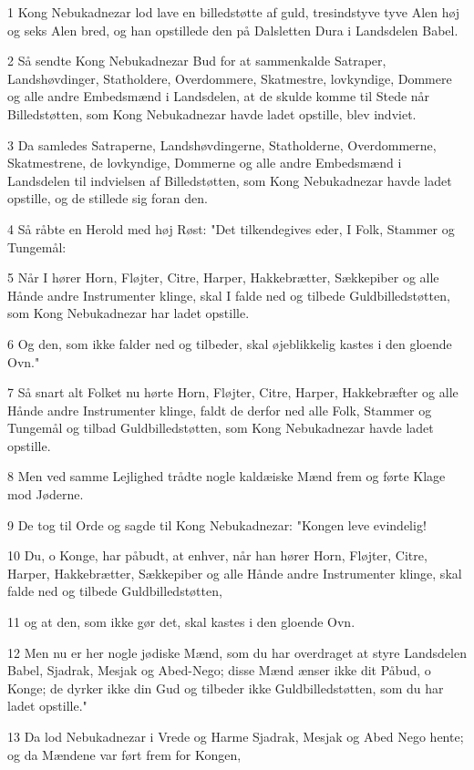 \par 1 Kong Nebukadnezar lod lave en billedstøtte af guld, tresindstyve tyve Alen høj og seks Alen bred, og han opstillede den på Dalsletten Dura i Landsdelen Babel.
\par 2 Så sendte Kong Nebukadnezar Bud for at sammenkalde Satraper, Landshøvdinger, Statholdere, Overdommere, Skatmestre, lovkyndige, Dommere og alle andre Embedsmænd i Landsdelen, at de skulde komme til Stede når Billedstøtten, som Kong Nebukadnezar havde ladet opstille, blev indviet.
\par 3 Da samledes Satraperne, Landshøvdingerne, Statholderne, Overdommerne, Skatmestrene, de lovkyndige, Dommerne og alle andre Embedsmænd i Landsdelen til indvielsen af Billedstøtten, som Kong Nebukadnezar havde ladet opstille, og de stillede sig foran den.
\par 4 Så råbte en Herold med høj Røst: "Det tilkendegives eder, I Folk, Stammer og Tungemål:
\par 5 Når I hører Horn, Fløjter, Citre, Harper, Hakkebrætter, Sækkepiber og alle Hånde andre Instrumenter klinge, skal I falde ned og tilbede Guldbilledstøtten, som Kong Nebukadnezar har ladet opstille.
\par 6 Og den, som ikke falder ned og tilbeder, skal øjeblikkelig kastes i den gloende Ovn."
\par 7 Så snart alt Folket nu hørte Horn, Fløjter, Citre, Harper, Hakkebræfter og alle Hånde andre Instrumenter klinge, faldt de derfor ned alle Folk, Stammer og Tungemål og tilbad Guldbilledstøtten, som Kong Nebukadnezar havde ladet opstille.
\par 8 Men ved samme Lejlighed trådte nogle kaldæiske Mænd frem og førte Klage mod Jøderne.
\par 9 De tog til Orde og sagde til Kong Nebukadnezar: "Kongen leve evindelig!
\par 10 Du, o Konge, har påbudt, at enhver, når han hører Horn, Fløjter, Citre, Harper, Hakkebrætter, Sækkepiber og alle Hånde andre Instrumenter klinge, skal falde ned og tilbede Guldbilledstøtten,
\par 11 og at den, som ikke gør det, skal kastes i den gloende Ovn.
\par 12 Men nu er her nogle jødiske Mænd, som du har overdraget at styre Landsdelen Babel, Sjadrak, Mesjak og Abed-Nego; disse Mænd ænser ikke dit Påbud, o Konge; de dyrker ikke din Gud og tilbeder ikke Guldbilledstøtten, som du har ladet opstille."
\par 13 Da lod Nebukadnezar i Vrede og Harme Sjadrak, Mesjak og Abed Nego hente; og da Mændene var ført frem for Kongen,
